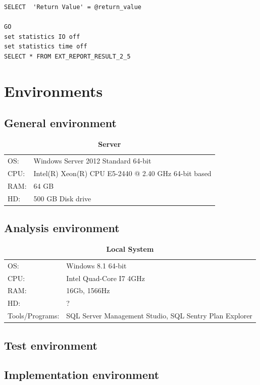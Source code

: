 \documentclass{cslthse-msc}
\begin{document}
\begin{appendices}
\begin{lstlisting}[caption={SQL batch to execute stored procedure report\_2\_5},label=spexec]
SELECT	'Return Value' = @return_value

GO
set statistics IO off
set statistics time off
SELECT * FROM EXT_REPORT_RESULT_2_5
\end{lstlisting}
\chapter{Environments}
\section{General environment}\label{sec:Genviron}
\begin{table}[H]
\begin{center}
\caption*{\textbf{Server}}
\begin{tabular}{l l}
OS: & Windows Server 2012 Standard 64-bit\\
CPU: & Intel(R) Xeon(R) CPU E5-2440 @ 2.40 GHz 64-bit based\\
RAM: & 64 GB \\
HD: & 500 GB Disk drive
\end{tabular}
\end{center}
\end{table}

\section{Analysis environment}\label{Aenviron}
\begin{table}[H]
\begin{center}
\caption*{\textbf{Local System}}
\begin{tabular}{l l}
OS: & Windows 8.1 64-bit\\
CPU: & Intel Quad-Core I7 4GHz\\
RAM: & 16Gb, 1566Hz\\
HD: & ? \\
Tools/Programs: & SQL Server Management Studio, SQL Sentry Plan Explorer\\
\end{tabular}
\end{center}
\end{table}
\section{Test environment}

\section{Implementation environment}


\end{appendices}
\end{document}
